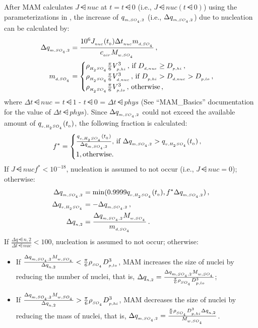 After MAM calculates $J\dsub{nuc}$ at $t = t\dsub{0}$ (i.e., $J\dsub{nuc}(t\dsub{0})$)
using the parameterizations in , the increase of
$q_{_{m,SO_{_4},2}}$ (i.e., $\Delta q_{_{m,SO_{_4},2}}$) due to nucleation can be
calculated by:
%
\begin{align}
\Delta q_{_{m,SO_{_4},2}} &= \frac{10^6 J_{_{nuc}}(t_{_{0}}) \Delta t_{_{nuc}} m_{_{d,SO_{_4}}}}
                          {c_{_{air}}M_{_{w,SO_{_4}}}} \,, \\
m_{_{d,SO_{_4}}} &= \begin{cases}
\rho_{_{H_{_2}SO_{_4}}} \frac{\pi}{6}V_{_{p,hi}}^3 \,, \, \text{if $D_{_{d,nuc}} \ge D_{_{p,hi}}$} \,, \\
\rho_{_{H_{_2}SO_{_4}}} \frac{\pi}{6}V_{_{d,nuc}}^3 \,, \, \text{if $D_{_{p,hi}} > D_{_{d,nuc}} > D_{_{p,lo}}$} \,, \\
\rho_{_{H_{_2}SO_{_4}}} \frac{\pi}{6}V_{_{p,lo}}^3 \,, \, \text{otherwise} \,,
\end{cases}
\end{align}
%
where $\Delta t\dsub{nuc}$ = $t\dsub{1}$ - $t\dsub{0}$ = $\Delta t\dsub{phys}$
(See ``MAM\_Basics'' documentation for the value of $\Delta t\dsub{phys}$).
Since $\Delta q_{_{m,SO_{_4},2}}$ could not exceed the available amount of
$q_{_{v,H_{_2}SO_{_4}}}(t_{_{0}})$, the following fraction is calculated:
\begin{equation}
f^* = \begin{cases}
\frac{q_{_{v,H_{_2}SO_{_4}}}(t_{_{0}})}{\Delta q_{_{m,SO_{_4},2}}}, \, \text{if $\Delta q_{_{m,SO_{_4},2}} > q_{_{v,H_{_2}SO_{_4}}}(t_{_{0}})$} \,, \\
1, \text{otherwise.} \\
\end{cases}
\end{equation}
If $J\dsub{nuc} f^* < 10^{-18}$, nucleation is assumed to not occur (i.e.,
$J\dsub{nuc} = 0$); otherwise:
%
\begin{align}
\Delta q_{_{m,SO_{_4},2}} &= \min ( 0.9999q_{_{v,H_{_2}SO_{_4}}}(t_{_{0}}), f^* \Delta q_{_{m,SO_{_4},2}} ) \,, \\
\Delta q_{_{v,H_{_2}SO_{_4}}} &= - \Delta q_{_{m,SO_{_4},2}} \,, \\
\Delta q_{_{n,2}} &= \frac{\Delta q_{_{m,SO_{_4},2}} M_{_{w,SO_{_4}}}}{m_{_{d,SO_{_4}}}} \,.
\end{align}
%
If $\frac{\Delta q\dsub{n,2}}{\Delta t\dsub{nuc}} < 100$,
nucleation is assumed to not occur; otherwise:
\begin{itemize}
\item If $\frac{\Delta q_{_{m,SO_{_4},2}} M_{_{w,SO_{_4}}}}{\Delta q_{_{n,2}}} <
\frac{\pi}{6} \rho_{_{SO_{_4}}} D_{_{p,lo}}^3$, MAM increases the size of nuclei by
reducing the number of nuclei, that is, $\Delta q_{_{n,2}} =
\frac{\Delta q_{_{m,SO_{_4},2}} M_{_{w,SO_{_4}}}}{\frac{\pi}{6} \rho_{_{SO_{_4}}} D_{_{p,lo}}^3}$;
\item If $\frac{\Delta q_{_{m,SO_{_4},2}} M_{_{w,SO_{_4}}}}{\Delta q_{_{n,2}}} >
\frac{\pi}{6} \rho_{_{SO_{_4}}} D_{_{p,hi}}^3$, MAM decreases the size of nuclei by
reducing the mass of nuclei, that is,
$\Delta q_{_{m,SO_{_4},2}} = \frac{\frac{\pi}{6} \rho_{_{SO_{_4}}} D_{_{p,hi}}^3 \Delta q_{_{n,2}}}{M_{_{w,SO_{_4}}}}$.
\end{itemize}
